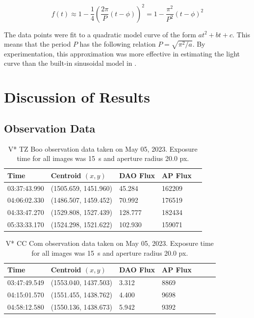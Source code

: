 \documentclass[12pt]{article}
\begin{document}
\begin{equation}
    f(t) \approx 1 - \frac{1}{4}\left( \frac{2\pi}{P}(t - \phi) \right)^{2} = 1 - \frac{\pi^2}{P^2}\left( t - \phi \right) ^2
\end{equation} 

The data points were fit to a quadratic model curve of the form $at^2 + bt + c$. This means that the period $P$ has the following relation $P=\sqrt{\pi^2 / a} $. By experimentation, this approximation was more effective in estimating the light curve than the built-in sinusoidal model in .

\section{Discussion of Results}

\subsection{Observation Data}

\begin{table}[htpb]
\centering
\begin{tabular}{lllll}
    \toprule
\textbf{Time} & \textbf{Centroid} $(x, y)$ & \textbf{DAO Flux} & \textbf{AP Flux} \\
\midrule
03:37:43.990  & (1505.659, 1451.960)                     & 45.284            & 162209                            \\
04:06:02.330  & (1486.507, 1459.452)                     & 70.992            & 176519                            \\
04:33:47.270  & (1529.808, 1527.439)                     & 128.777           & 182434                            \\
05:33:33.170  & (1524.298, 1521.622)                     & 102.930           & 159071                           \\
\bottomrule
\end{tabular}
\caption{V* TZ Boo observation data taken on May 05, 2023. Exposure time for all images was \SI{15}{\s} and aperture radius 20.0 px.}
\end{table}

\begin{table}[htpb]
\centering
\begin{tabular}{lllllll}
    \toprule
\textbf{Time} & \textbf{Centroid} $(x, y)$ & \textbf{DAO Flux} & \textbf{AP Flux} \\
\midrule
03:47:49.549  & (1553.040, 1437.503)                     & 3.312             & 8869      \\
04:15:01.570  & (1551.455, 1438.762)                     & 4.400             & 9698                              \\
04:58:12.580  & (1550.136, 1438.673)                     & 5.942             & 9392                              \\
\bottomrule
\end{tabular}
\caption{V* CC Com observation data taken on May 05, 2023. Exposure time for all images was \SI{15}{\s} and aperture radius 20.0 px.}
\end{table}
\end{document}
